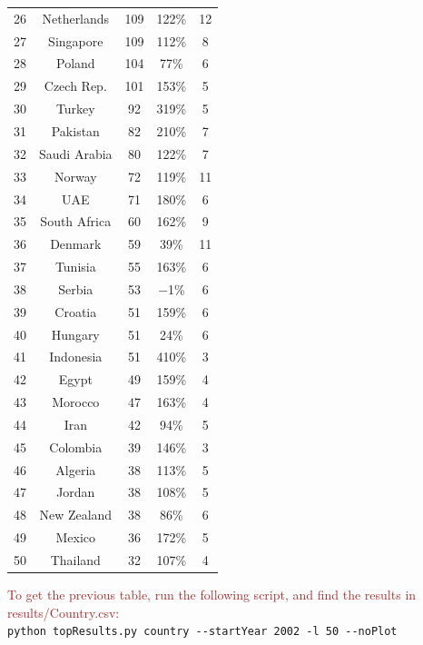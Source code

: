 \documentclass[symmetry,article,accept,moreauthors,pdftex10pt,a4paper]{mdpi}
\begin{document}
\begin{table}[H]
\begin{tabular}{ccccc}
		26 & Netherlands & 109 & 122\% & 12 \\
		27 & Singapore & 109 & 112\% & 8\\
		28 & Poland & 104 & 77\% & 6\\
		29 & Czech Rep. & 101 & 153\% & 5\\
		30 & Turkey & 92 & 319\% & 5\\
		31 & Pakistan & 82 & 210\% & 7\\
		32 & Saudi Arabia & 80 & 122\% & 7 \\
		 33 & Norway & 72 & 119\% & 11\\
		34 & UAE & 71 & 180\% & 6\\
		35 & South Africa & 60 & 162\% & 9  \\
		 36 & Denmark & 59 & 39\% & 11 \\
		37 & Tunisia & 55 & 163\% & 6 \\
		38 & Serbia & 53 & $-$1\% & 6 \\
		39 & Croatia & 51 & 159\% & 6 \\
		40 & Hungary & 51 & 24\% & 6 \\
		41 & Indonesia & 51 & 410\% & 3 \\
		42 & Egypt & 49 & 159\% & 4 \\
		43 & Morocco & 47 & 163\% & 4 \\
		44 & Iran & 42 & 94\% & 5 \\
		45 & Colombia & 39 & 146\% & 3 \\
		46 & Algeria & 38 & 113\% & 5 \\
		47 & Jordan & 38 & 108\% & 5 \\
		48 & New Zealand & 38 & 86\% & 6 \\
		49 & Mexico & 36 & 172\% & 5 \\
		50 & Thailand & 32 & 107\% & 4 \\
		\bottomrule
	\end{tabular}
\end{table}

\noindent
\textcolor{brown}{To get the previous table, run the following script, and find the results in results/Country.csv:}\\
\hspace*{0.5cm}\verb|python topResults.py country --startYear 2002 -l 50 --noPlot|\\
\end{document}
